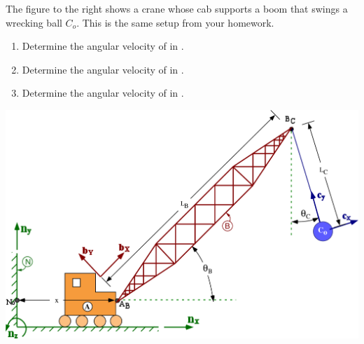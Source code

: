 \begin{minipage}{0.5\textwidth}
The figure to the right shows a crane whose cab  supports a boom  that swings
a wrecking ball $C_o$. This is the same setup from your homework.
\begin{enumerate}
\item Determine the angular velocity of  in .
\\[2.0pc]
\item Determine the angular velocity of  in .
\\[2.0pc]
\item Determine the angular velocity of  in .
\\[4.0pc]
\end{enumerate}

\end{minipage}
\hfill
\begin{minipage}{0.48\textwidth}
\flushright
\vspace{-5.0pc}
\includegraphics[width=\textwidth]{crane.png}
\end{minipage}